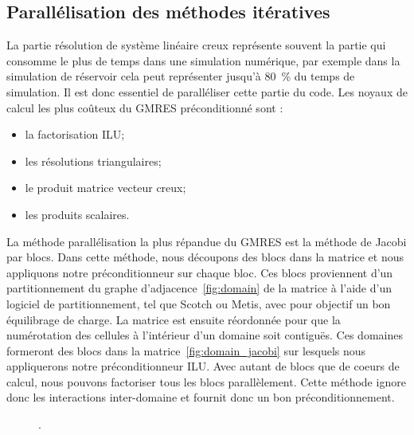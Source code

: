 \subsection{Parallélisation des méthodes itératives}
La partie résolution de système linéaire creux représente souvent la partie qui consomme le plus de temps dans une simulation numérique, par exemple dans la simulation de réservoir cela peut représenter jusqu'à 80~\% du temps de simulation.
%
Il est donc essentiel de paralléliser cette partie du code.
%
Les noyaux de calcul les plus coûteux du GMRES préconditionné sont :
\begin{itemize}
  \item la factorisation ILU;
  \item les résolutions triangulaires;
  \item le produit matrice vecteur creux;
  \item les produits scalaires.
\end{itemize}

La méthode parallélisation la plus répandue du GMRES est la méthode de Jacobi par blocs.
%
Dans cette méthode, nous découpons des blocs dans la matrice et nous appliquons notre préconditionneur sur chaque bloc.
%
Ces blocs proviennent d'un partitionnement du graphe d'adjacence~\ref{fig:domain} de la matrice à l'aide d'un logiciel de partitionnement, tel que Scotch ou Metis, avec pour objectif un bon équilibrage de charge.
%
La matrice est ensuite réordonnée pour que la numérotation des cellules à l'intérieur d'un domaine soit contiguës.
%
Ces domaines formeront des blocs dans la matrice~\ref{fig:domain_jacobi} sur lesquels nous appliquerons notre préconditionneur ILU.
%
Avec autant de blocs que de coeurs de calcul, nous pouvons factoriser tous les blocs parallèlement.
%
Cette méthode ignore donc les interactions inter-domaine et fournit donc un bon préconditionnement.


\begin{figure}[!h]
     \begin{center}
    \end{center}
    \caption{.}
    \label{fig:jacobi}
\end{figure}
